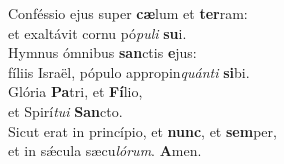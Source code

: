 \oddverse Conféssio ejus super \textbf{cæ}lum et \textbf{ter}ram:~\*\\
\oddverse et exaltávit cornu pó\textit{pu}\textit{li} \textbf{su}i.\\
\evenverse Hymnus ómnibus \textbf{san}ctis \textbf{e}jus:~\*\\
\evenverse fíliis Israël, pópulo appropin\textit{quán}\textit{ti} \textbf{si}bi.\\
\oddverse Glória \textbf{Pa}tri, et \textbf{Fí}lio,~\*\\
\oddverse et Spirí\textit{tu}\textit{i} \textbf{San}cto.\\
\evenverse Sicut erat in princípio, et \textbf{nunc}, et \textbf{sem}per,~\*\\
\evenverse et in sǽcula sæcu\textit{ló}\textit{rum}. \textbf{A}men.\\

